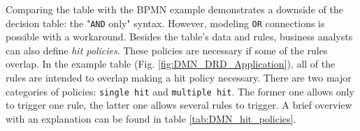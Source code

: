Comparing the table with the BPMN example demonstrates a downside of the decision table: the "\texttt{AND} only" syntax. However, modeling \texttt{OR} connections is possible with a workaround. \newpage Besides the table's data and rules, business analysts can also define \textit{hit policies}. These policies are necessary if some of the rules overlap. In the example table (Fig. \ref{fig:DMN_DRD_Application}), all of the rules are intended to overlap making a hit policy necessary. There are two major categories of policies: \texttt{single hit} and \texttt{multiple hit}. The former one allows only to trigger one rule, the latter one allows several rules to trigger. A brief overview with an explanation can be found in table \ref{tab:DMN_hit_policies}. 

\begin{table}[]
\centering
{}
\caption{DMN hit policies cited from the DMN specification \cite{DMNspec2016}.}
\label{tab:DMN_hit_policies}
\end{table}
 
